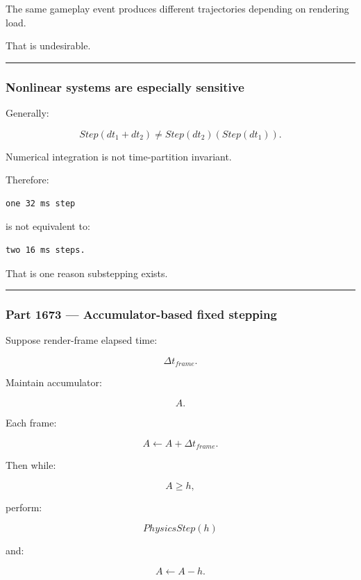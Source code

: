 The same gameplay event produces different trajectories depending on rendering load.

That is undesirable.

\begin{center}\rule{0.5\linewidth}{0.5pt}\end{center}

\subsubsection{Nonlinear systems are especially sensitive}\label{nonlinear-systems-are-especially-sensitive}

Generally:

\[
Step(dt_1+dt_2)
\neq
Step(dt_2)(Step(dt_1)).
\]

Numerical integration is not time-partition invariant.

Therefore:

\begin{verbatim}
one 32 ms step
\end{verbatim}

is not equivalent to:

\begin{verbatim}
two 16 ms steps.
\end{verbatim}

That is one reason substepping exists.

\begin{center}\rule{0.5\linewidth}{0.5pt}\end{center}

\subsubsection{Part 1673 --- Accumulator-based fixed stepping}\label{part-1673-accumulator-based-fixed-stepping}

Suppose render-frame elapsed time:

\[
\Delta t_{frame}.
\]

Maintain accumulator:

\[
A.
\]

Each frame:

\[
A\leftarrow A+\Delta t_{frame}.
\]

Then while:

\[
A\ge h,
\]

perform:

\[
PhysicsStep(h)
\]

and:

\[
A\leftarrow A-h.
\]


